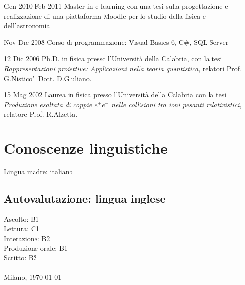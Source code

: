 \begin{CV}
	\item[Gen 2010-Feb 2011] Master in e-learning con una tesi sulla progettazione e realizzazione di una piattaforma Moodle per lo studio della fisica e dell'astronomia
	
	\item[Nov-Dic 2008] Corso di programmazione: Visual Basics 6, C\#, SQL Server
	
	\item[12 Dic 2006] Ph.D. in fisica presso l'Università della Calabria, con la tesi {\em Rappresentazioni proiettive: Applicazioni nella teoria quantistica}, relatori Prof. G.Nistico', Dott. D.Giuliano.
	
	\item[15 Mag 2002] Laurea in fisica presso l'Università della Calabria con la tesi {\em Produzione esaltata di coppie $e^+ e^-$ nelle collisioni tra ioni pesanti relativistici}, relatore Prof. R.Alzetta.
\end{CV}
%
\newpage
%
\section{Conoscenze linguistiche}
Lingua madre: italiano
\subsection*{Autovalutazione: lingua inglese}
Ascolto: B1\\
Lettura: C1\\
Interazione: B2\\
Produzione orale: B1\\
Scritto: B2\\\\
%
\vspace{2\baselineskip}
\noindent Milano, \today